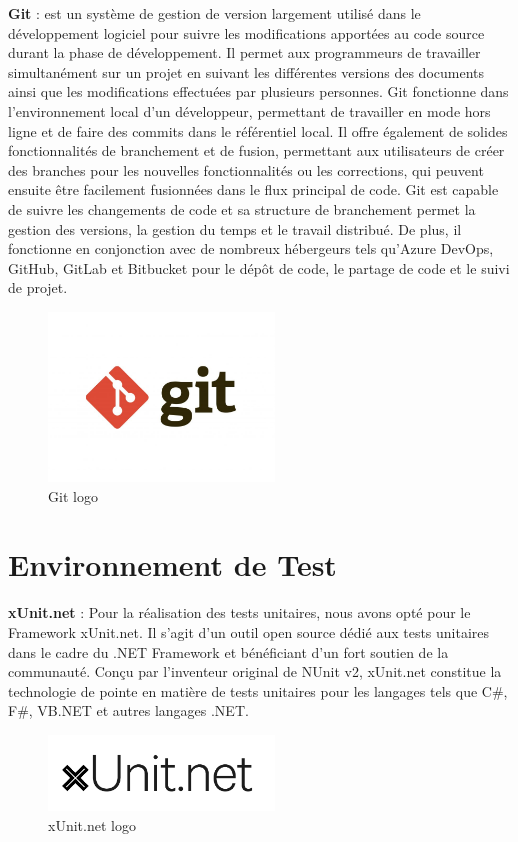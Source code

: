 \textbf{Git} : est un système de gestion de version largement utilisé dans le développement logiciel pour suivre les modifications apportées au code source durant la phase de développement. Il permet aux programmeurs de travailler simultanément sur un projet en suivant les différentes versions des documents ainsi que les modifications effectuées par plusieurs personnes. Git fonctionne dans l'environnement local d'un développeur, permettant de travailler en mode hors ligne et de faire des commits dans le référentiel local. Il offre également de solides fonctionnalités de branchement et de fusion, permettant aux utilisateurs de créer des branches pour les nouvelles fonctionnalités ou les corrections, qui peuvent ensuite être facilement fusionnées dans le flux principal de code. Git est capable de suivre les changements de code et sa structure de branchement permet la gestion des versions, la gestion du temps et le travail distribué. De plus, il fonctionne en conjonction avec de nombreux hébergeurs tels qu'Azure DevOps, GitHub, GitLab et Bitbucket pour le dépôt de code, le partage de code et le suivi de projet.

\begin{figure}[H]
    \centering
    \includegraphics[width=6cm]{Figures/gitlogo.jpg}
    \caption{Git logo}
\end{figure}



\section{Environnement de Test}


\textbf{xUnit.net} : Pour la réalisation des tests unitaires, nous avons opté pour le Framework xUnit.net. Il s'agit d'un outil open source dédié aux tests unitaires dans le cadre du .NET Framework et bénéficiant d'un fort soutien de la communauté. Conçu par l'inventeur original de NUnit v2, xUnit.net constitue la technologie de pointe en matière de tests unitaires pour les langages tels que C\#, F\#, VB.NET et autres langages .NET.
\\
\begin{figure}[H]
    \centering
    \includegraphics[width=6cm]{Figures/xunitlogo.png}
    \caption{xUnit.net logo}
\end{figure}


